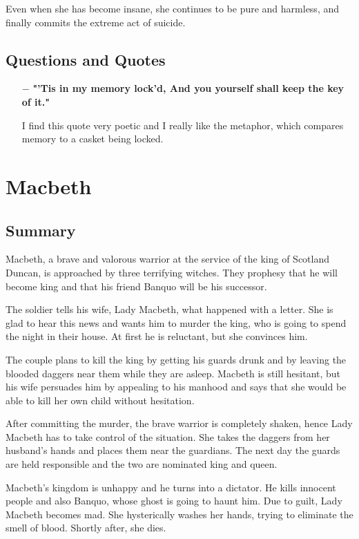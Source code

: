 \documentclass[]{article}
\begin{document}
Even when she has become insane, she continues to be pure and harmless, and finally commits the extreme act of suicide.

\subsection*{Questions and Quotes}
\begin{itemize}
    \item[$-$] \textbf{"'Tis in my memory lock'd, And you yourself shall keep the key of it."} \par
        I find this quote very poetic and I really like the metaphor, which compares memory to a casket being locked.
\end{itemize}


\newpage
\section{Macbeth}
\subsection*{Summary}
\hspace{1em}
Macbeth, a brave and valorous warrior at the service of the king of Scotland Duncan, is approached by three terrifying witches. They prophesy that he will become king and that his friend Banquo will be his successor.

The soldier tells his wife, Lady Macbeth, what happened with a letter. She is glad to hear this news and wants him to murder the king, who is going to spend the night in their house. At first he is reluctant, but she convinces him.

The couple plans to kill the king by getting his guards drunk and by leaving the blooded daggers near them while they are asleep. Macbeth is still hesitant, but his wife persuades him by appealing to his manhood and says that she would be able to kill her own child without hesitation.

After committing the murder, the brave warrior is completely shaken, hence Lady Macbeth has to take control of the situation. She takes the daggers from her husband's hands and places them near the guardians. The next day the guards are held responsible and the two are nominated king and queen.

Macbeth's kingdom is unhappy and he turns into a dictator. He kills innocent people and also Banquo, whose ghost is going to haunt him. Due to guilt, Lady Macbeth becomes mad. She hysterically washes her hands, trying to eliminate the smell of blood. Shortly after, she dies.
\end{document}
